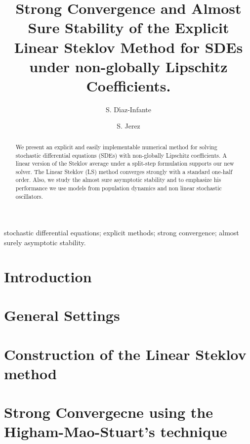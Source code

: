 \documentclass[sort&compress, preprint]{elsarticle}
\theoremstyle{definition}
\theoremstyle{plain}%
\theoremstyle{remark}
\newcommand{\SM}{LS\xspace}
\begin{document}
	\begin{frontmatter}
		\title{
				Strong Convergence and Almost Sure Stability of the Explicit Linear Steklov Method
				for SDEs under non-globally Lipschitz Coefficients.
		}%
		\author[sj]{S. D\'{\i}az-Infante}
		\author[sj]{S. Jerez}
		\address[sj]{Split Step Linear Steklov Method 
		Department of Applied Mathematics, CIMAT, Guanajuato, Gto., Mexico,
		36240.
		}
	\begin{abstract}
		We present an explicit and easily implementable numerical method for
		solving stochastic differential equations (SDEs) with non-globally Lipschitz
		coefficients. A linear version of the Steklov average under a split-step formulation supports our new solver.
		The Linear Steklov (\SM) method converges strongly with a standard 
		one-half order.  Also, we study the almost sure asymptotic stability and to emphasize his 
		performance we use models from population dynamics and non linear stochastic oscillators.
	\end{abstract}
	\begin{keyword}
		stochastic differential equations;
		explicit methods; strong convergence; almost surely asymptotic stability.
	\end{keyword}
	\end{frontmatter}
	\pagebreak
	\tableofcontents
	\pagebreak
	\section{Introduction}
		
	\section{General Settings}
		
		
	\section{Construction of the Linear Steklov method}
		
	\section{Strong Convergecne using the Higham-Mao-Stuart's technique}
		
\end{document}
